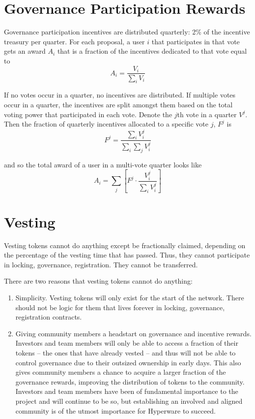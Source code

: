 \documentclass{article}
\begin{document}
\section{Governance Participation Rewards}

Governance participation incentives are distributed quarterly: 2\% of the incentive treasury per quarter.
For each proposal, a user $i$ that participates in that vote gets an award $A_i$ that is a fraction of the incentives dedicated to that vote equal to
\begin{equation}
A_i = \frac{V_i}{\sum_i V_i}
\end{equation}

If no votes occur in a quarter, no incentives are distributed.
If multiple votes occur in a quarter, the incentives are split amongst them based on the total voting power that participated in each vote.
Denote the $j$th vote in a quarter $V^{j}$.
Then the fraction of quarterly incentives allocated to a specific vote $j$, $F^{j}$ is
\begin{equation}
F^{j} = \frac{\sum_i V^{j}_i}{\sum_i \sum_j V^{j}_i}
\end{equation}

and so the total award of a user in a multi-vote quarter looks like
\begin{equation}
A_i = \sum_j \left[F^{j} \cdot \frac{V^{j}_i}{\sum_i V^{j}_i}\right]
\end{equation}

\section{Vesting}

Vesting tokens cannot do anything except be fractionally claimed, depending on the percentage of the vesting time that has passed.
Thus, they cannot participate in locking, governance, registration.
They cannot be transferred.

There are two reasons that vesting tokens cannot do anything:
\begin{enumerate}
    \item Simplicity.
       Vesting tokens will only exist for the start of the network.
       There should not be logic for them that lives forever in locking, governance, registration contracts.
    \item Giving community members a headstart on governance and incentive rewards.
       Investors and team members will only be able to access a fraction of their tokens -- the ones that have already vested -- and thus will not be able to control governance due to their outsized ownership in early days.
       This also gives community members a chance to acquire a larger fraction of the governance rewards, improving the distribution of tokens to the community.
       Investors and team members have been of fundamental importance to the project and will continue to be so, but establishing an involved and aligned community is of the utmost importance for Hyperware to succeed.
\end{enumerate}
\end{document}
